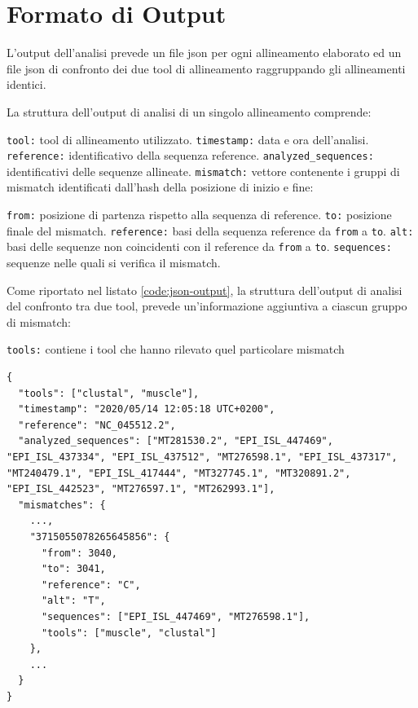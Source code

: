 \documentclass[11pt,italian]{article}
\makeatletter
\newcommand*{\lstitem}[1][]{%
  \setbox0\hbox\bgroup
    \patchcmd{\lst@InlineM}{\@empty}{\@empty\egroup\item[\usebox0]\leavevmode\ignorespaces}{}{}%
    \lstinline[#1]%
}
\makeatother
\begin{document}
\section{Formato di Output}
L'output dell'analisi prevede un file json per ogni allineamento elaborato ed un file json di confronto dei due tool di allineamento raggruppando gli allineamenti identici.

La struttura dell'output di analisi di un singolo allineamento comprende:
\begin{description}
  \lstitem{tool:} tool di allineamento utilizzato.
  \lstitem{timestamp:} data e ora dell'analisi.
  \lstitem{reference:} identificativo della sequenza reference.
  \lstitem{analyzed_sequences:} identificativi delle sequenze allineate.
  \lstitem{mismatch:} vettore contenente i gruppi di mismatch identificati dall'hash della posizione di inizio e fine:
  \begin{description}
    \lstitem{from:} posizione di partenza rispetto alla sequenza di reference.
    \lstitem{to:} posizione finale del mismatch.
    \lstitem{reference:} basi della sequenza reference da \lstinline{from} a \lstinline{to}.
    \lstitem{alt:} basi delle sequenze non coincidenti con il reference da \lstinline{from} a \lstinline{to}.
    \lstitem{sequences:} sequenze nelle quali si verifica il mismatch.
  \end{description}
\end{description}

\noindent
Come riportato nel listato \ref{code:json-output}, la struttura dell'output di analisi del confronto tra due tool, prevede un'informazione aggiuntiva a ciascun gruppo di mismatch:
\begin{description}
  \lstitem{tools:} contiene i tool che hanno rilevato quel particolare mismatch
\end{description}

\begin{lstlisting}[basicstyle=\small\ttfamily,caption=Esempio di output,label=code:json-output]
{
  "tools": ["clustal", "muscle"],
  "timestamp": "2020/05/14 12:05:18 UTC+0200",
  "reference": "NC_045512.2",
  "analyzed_sequences": ["MT281530.2", "EPI_ISL_447469", "EPI_ISL_437334", "EPI_ISL_437512", "MT276598.1", "EPI_ISL_437317", "MT240479.1", "EPI_ISL_417444", "MT327745.1", "MT320891.2", "EPI_ISL_442523", "MT276597.1", "MT262993.1"],
  "mismatches": {
    ...,
    "3715055078265645856": {
      "from": 3040,
      "to": 3041,
      "reference": "C",
      "alt": "T",
      "sequences": ["EPI_ISL_447469", "MT276598.1"],
      "tools": ["muscle", "clustal"]
    },
    ...
  }
}
\end{lstlisting}
\end{document}
